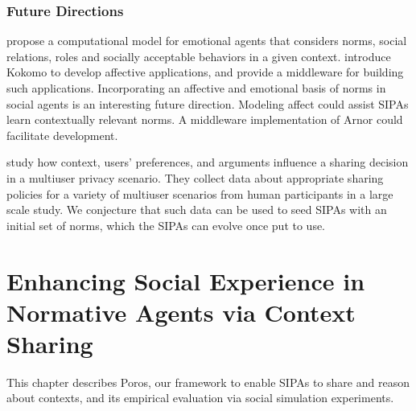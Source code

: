 \documentclass[11pt,          %
               phd,           %
               onehalfspacing %
               ]{ncsuthesis}
\newcommand{\frameworkA}{Arnor\xspace}
\newcommand{\frameworkB}{Poros\xspace}
\begin{document}
\subsection*{Future Directions}

\citet{Ferreira-AAAI13-GroupRelations} propose a
computational model for emotional agents that considers norms, social
relations, roles and socially acceptable behaviors in a given context.
\citet{Sollenberger-AAMAS11-Kokomo} introduce Kokomo 
to develop affective applications, and provide a middleware for building 
such applications. 
Incorporating an affective \citep{Sollenberger-AAMAS11-Kokomo} and emotional
basis of norms in social agents is an interesting future direction.
Modeling affect could assist SIPAs learn contextually relevant norms. 
A middleware implementation of \frameworkA could facilitate development.

\citet{TOCHI-17:Multiuser} study how context, users' preferences, 
and arguments influence a sharing decision in a multiuser privacy scenario. 
They collect data about appropriate sharing policies for a variety of multiuser
scenarios from human participants in a large scale study. We conjecture that 
such data can be used to seed SIPAs with an initial set of norms, which the 
SIPAs can evolve once put to use.




\chapter[Enhancing Social Experience via Context Sharing]{Enhancing Social Experience in Normative Agents via Context Sharing}
\label{chap:precious}

This chapter describes \frameworkB, our framework to enable SIPAs to
share and reason about contexts, and its empirical evaluation via social
simulation experiments.

\end{document}
